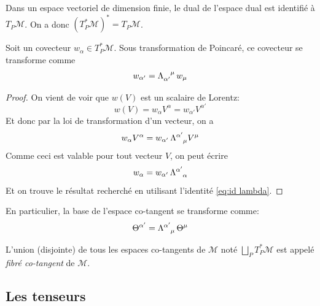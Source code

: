 {\begin{rmk}
    \label{rmk:tangent^2}
    Dans un espace vectoriel de dimension finie, le dual de l'espace dual est identifié à $T_P\mathcal{M}$. On a donc $(T^*_P\mathcal{M})^* = T_P\mathcal{M}$.
\end{rmk} 
\begin{theoremframe}
    \begin{propri}
        Soit un covecteur $w_\alpha\in T^*_P\mathcal{M}$. Sous transformation de Poincaré, ce covecteur se transforme comme
    \begin{align}
        w_{\alpha'} = \Lambda\indices{_{\alpha'}^{\mu}} \, w_\mu
    \end{align}
    \end{propri}
\end{theoremframe}
\begin{proof}
    On vient de voir que $w(V)$ est un scalaire de Lorentz:
    \begin{equation}
        w(V) = w_{\alpha} V^{\alpha} = w_{\alpha'} V^{\alpha'} 
    \end{equation}
    Et donc par la loi de transformation d'un vecteur, on a
    \begin{equation}
        w_{\alpha} V^{\alpha} = w_{\alpha'}\, \Lambda\indices{^{\alpha'}_{\mu}} V^\mu
    \end{equation}
    Comme ceci est valable pour tout vecteur $V$, on peut écrire
    \begin{equation}
        w_{\alpha}  = w_{\alpha'} \,\Lambda\indices{^{\alpha'}_{\alpha}}
    \end{equation}
    Et on trouve le résultat recherché en utilisant l'identité \ref{eq:id lambda}.
\end{proof}

En particulier, la base de l'espace co-tangent se transforme comme:
\begin{equation}
    \Theta^{\alpha'} = \Lambda\indices{^{\alpha'}_{\mu}}\,  \Theta^{\mu}
\end{equation}
\begin{theoremframe}
    \begin{defi}
        L'union (disjointe) de tous les espaces co-tangents de $\mathcal{M}$ noté $\bigsqcup_P T^*_P\mathcal{M}$ est appelé \textit{fibré co-tangent} de $\mathcal{M}$.
    \end{defi}
\end{theoremframe}
}
\subsection{Les tenseurs}

